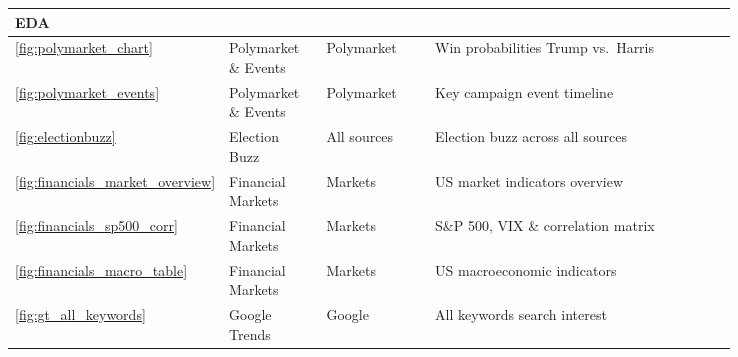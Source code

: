 \begin{longtable}{|p{0.05\linewidth}|p{0.14\linewidth}|p{0.16\linewidth}|p{0.43\linewidth}|p{0.06\linewidth}|}
\multicolumn{5}{|l|}{\rule[-0.3em]{0pt}{1.2em}\textcolor{textprimary}{\sffamily\bfseries\small\enspace 1 \enspace EDA}} \\
\hline
\textcolor{textmuted}{\small\ref{fig:polymarket_chart}}            & \textcolor{textmuted}{\small Polymarket \& Events} & \textcolor{textmuted}{\small Polymarket}      & \textcolor{textmuted}{\small Win probabilities Trump vs.\ Harris}      & \textcolor{textmuted}{\small\pageref{fig:polymarket_chart}} \\\hline
\textcolor{textmuted}{\small\ref{fig:polymarket_events}}           & \textcolor{textmuted}{\small Polymarket \& Events} & \textcolor{textmuted}{\small Polymarket}      & \textcolor{textmuted}{\small Key campaign event timeline}              & \textcolor{textmuted}{\small\pageref{fig:polymarket_events}} \\\hline
\textcolor{textmuted}{\small\ref{fig:electionbuzz}}                & \textcolor{textmuted}{\small Election Buzz}        & \textcolor{textmuted}{\small All sources}     & \textcolor{textmuted}{\small Election buzz across all sources}         & \textcolor{textmuted}{\small\pageref{fig:electionbuzz}} \\\hline
\textcolor{textmuted}{\small\ref{fig:financials_market_overview}}  & \textcolor{textmuted}{\small Financial Markets}    & \textcolor{textmuted}{\small Markets}         & \textcolor{textmuted}{\small US market indicators overview}            & \textcolor{textmuted}{\small\pageref{fig:financials_market_overview}} \\\hline
\textcolor{textmuted}{\small\ref{fig:financials_sp500_corr}}       & \textcolor{textmuted}{\small Financial Markets}    & \textcolor{textmuted}{\small Markets}         & \textcolor{textmuted}{\small S\&P 500, VIX \& correlation matrix}     & \textcolor{textmuted}{\small\pageref{fig:financials_sp500_corr}} \\\hline
\textcolor{textmuted}{\small\ref{fig:financials_macro_table}}      & \textcolor{textmuted}{\small Financial Markets}    & \textcolor{textmuted}{\small Markets}         & \textcolor{textmuted}{\small US macroeconomic indicators}              & \textcolor{textmuted}{\small\pageref{fig:financials_macro_table}} \\\hline
\textcolor{textmuted}{\small\ref{fig:gt_all_keywords}}             & \textcolor{textmuted}{\small Google Trends}        & \textcolor{textmuted}{\small Google}          & \textcolor{textmuted}{\small All keywords search interest}             & \textcolor{textmuted}{\small\pageref{fig:gt_all_keywords}} \\\hline

\end{longtable}
